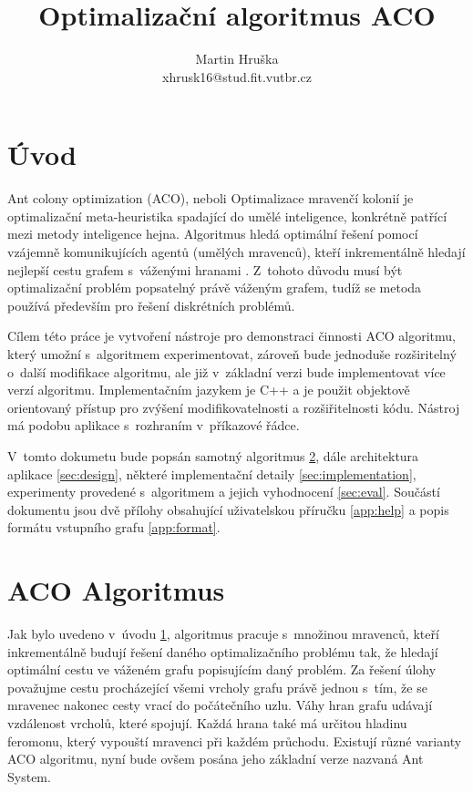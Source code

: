 \documentclass[a4paper, 12pt]{article}
\title{Optimalizační algoritmus ACO}
\author{Martin Hruška\\xhrusk16@stud.fit.vutbr.cz}
\date{}
\begin{document}
\maketitle

\section{Úvod}
\label{sec:intro}
Ant colony optimization (ACO), neboli Optimalizace mravenčí kolonií je optimalizační meta-heuristika spadající do umělé inteligence,
konkrétně patřící mezi metody inteligence hejna. Algoritmus hledá optimální řešení pomocí vzájemně komunikujících agentů (umělých mravenců), kteří
inkrementálně hledají nejlepší cestu grafem s~váženými hranami \cite{aco:main}. 
Z~tohoto důvodu musí být optimalizační problém popsatelný právě váženým grafem, tudíž se metoda používá především pro řešení diskrétních problémů.

Cílem této práce je vytvoření nástroje pro demonstraci činnosti ACO algoritmu, který umožní s~algoritmem experimentovat, zároveň bude jednoduše rozširitelný
o~další modifikace algoritmu, ale již v~základní verzi bude implementovat více verzí algoritmu. Implementačním jazykem je C++ a je použit objektově orientovaný
přístup pro zvýšení modifikovatelnosti a rozšiřitelnosti kódu. Nástroj má podobu aplikace s~rozhraním v~příkazové řádce.

V~tomto dokumetu bude popsán samotný algoritmus \ref{sec:algorithm}, dále architektura aplikace \ref{sec:design},
některé implementační detaily \ref{sec:implementation}, experimenty provedené s~algoritmem a jejich vyhodnocení \ref{sec:eval}.
Součástí dokumentu jsou dvě přílohy obsahující uživatelskou příručku \ref{app:help} a popis formátu vstupního grafu \ref{app:format}.

\section{ACO Algoritmus}
\label{sec:algorithm}
Jak bylo uvedeno v~úvodu \ref{sec:intro}, algoritmus pracuje s~množinou mravenců, kteří inkrementálně budují řešení daného optimalizačního problému tak, že
hledají optimální cestu ve váženém grafu popisujícím daný problém. Za řešení úlohy považujme cestu procházející všemi vrcholy grafu právě jednou s~tím, že se
mravenec nakonec cesty vrací do počátečního uzlu. Váhy hran grafu udávají vzdálenost vrcholů, které spojují. Každá hrana také má určitou hladinu feromonu, který
vypouští mravenci při každém průchodu. Existují různé varianty ACO algoritmu, nyní bude ovšem posána jeho základní verze nazvaná Ant System.
\end{document}
